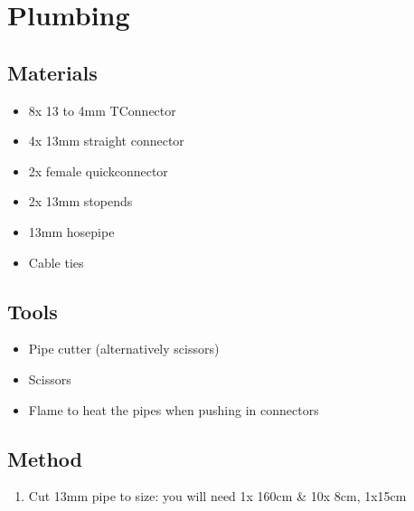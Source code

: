 \documentclass[letterpaper,10pt,english]{sphinxmanual}
\begin{document}
\section{Plumbing}
\label{\detokenize{plumbing:plumbing}}\label{\detokenize{plumbing::doc}}
\noindent{}


\subsection{Materials}
\label{\detokenize{plumbing:materials}}\begin{itemize}
\item {} 
8x 13 to 4mm T\sphinxhyphen{}Connector

\item {} 
4x 13mm straight connector

\item {} 
2x female quick\sphinxhyphen{}connector

\item {} 
2x 13mm stop\sphinxhyphen{}ends

\item {} 
13mm hosepipe

\item {} 
Cable ties

\end{itemize}


\subsection{Tools}
\label{\detokenize{plumbing:tools}}\begin{itemize}
\item {} 
Pipe cutter (alternatively scissors)

\item {} 
Scissors

\item {} 
Flame to heat the pipes when pushing in connectors

\end{itemize}


\subsection{Method}
\label{\detokenize{plumbing:method}}
\noindent{}
\begin{enumerate}
%
\item {} 
Cut 13mm pipe to size: you will need 1x 160cm \& 10x 8cm, 1x15cm

\end{enumerate}
\end{document}
